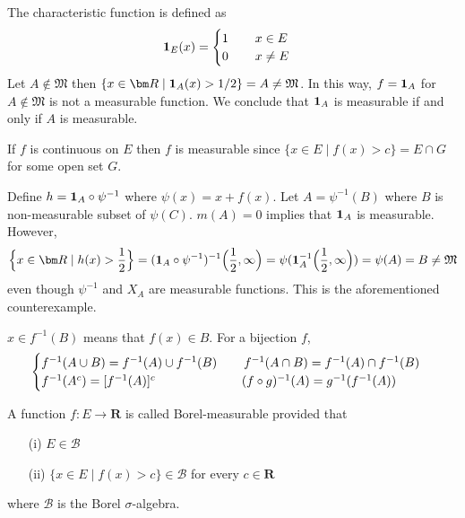 \vspace{2ex}
\begin{ex}
The characteristic function is defined as 
\[{\bf 1}_{E}(x)=\begin{cases}
1\hspace{5ex}x\in E\\
0\hspace{5ex}x\ne E
\end{cases}\]
Let $A\notin \mathfrak{M}$ then $\{x\in {\bm R} \;|\; {\bf 1}_{A}(x)>1/2\}=A\ne \mathfrak{M}$. In this way, $f={\bf 1}_{A}$ for $A\notin \mathfrak{M}$ is not a measurable function. We conclude that ${\bf 1}_{A}$ is measurable if and only if $A$ is measurable.
\end{ex}
\vspace{2ex}
\begin{ex}
If $f$ is continuous on $E$ then $f$ is measurable since $\{x\in E \;|\; f(x)>c\}=E\cap G$ for some open set $G$. 
\end{ex}
\vspace{2ex}
\begin{ex}
Define $h={\bf 1}_{A}\circ \psi ^{-1}$ where $\psi (x)=x+f(x)$. Let $A=\psi ^{-1}(B)$ where $B$ is non-measurable subset of $\psi (C)$. $m(A)=0$ implies that ${\bf 1}_{A}$ is measurable. However,
\[\Big\{x\in {\bm R} \;|\; h(x)>\dfrac{1}{2}\Big\}=({\bf 1}_{A}\circ \psi ^{-1})^{-1}\Big(\dfrac{1}{2},\infty \Big)=\psi ({\bf 1}^{-1}_{A}\Big(\dfrac{1}{2},\infty \Big))=\psi (A)=B\ne \mathfrak{M}\]
even though $\psi ^{-1}$ and $X_{A}$ are measurable functions. This is the aforementioned counterexample.
\end{ex}
\vspace{2ex}
\begin{recall}
$x\in f^{-1}(B)$ means that $f(x)\in B$. For a bijection $f$, 
\[\begin{cases}
f^{-1}(A\cup B)=f^{-1}(A)\cup f^{-1}(B)\hspace{5ex}f^{-1}(A\cap B)=f^{-1}(A)\cap f^{-1}(B)\\
f^{-1}(A^{c})=[f^{-1}(A)]^{c}\hspace{16ex}(f\circ g)^{-1}(A)=g^{-1}(f^{-1}(A))
\end{cases}\]
\end{recall}
\vspace{2ex}
\begin{defi}
A function $f:E\rightarrow {\bm R}$ is called Borel-measurable provided that
\begin{itemize}
	\item[(i)] $E\in \mathcal{B}$
	\item[(ii)] $\{x\in E \;|\;f(x)>c \}\in \mathcal{B}$ for every $c\in {\bm R}$ 
\end{itemize}
where $\mathcal{B}$ is the Borel $\sigma $-algebra.
\end{defi}
